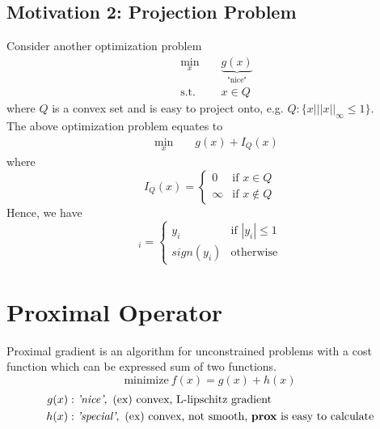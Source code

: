 \documentclass[12pt]{report}
\begin{document}
\subsection{Motivation 2: Projection Problem}
Consider another optimization problem
\begin{equation}
\begin{aligned}
    &  \underset{x}{\text{ min }}
    && \underbrace{g(x)}_{\text{"nice"}} \\
    &  \text{ s.t. } 
    && x \in Q
\end{aligned}
\end{equation}
where $Q$ is a convex set and is easy to project onto, e.g. $Q: \{ x| ||x||_{\infty} \leq 1 \}$. \\
The above optimization problem equates to 
\begin{equation}
\begin{aligned}
    &  \underset{x}{\text{ min }}
    && g(x) + I_Q(x) 
\end{aligned}
\end{equation}
where 
\begin{equation}
    I_Q (x) = 
   \begin{cases}
   0 &\mbox{if } x \in Q  \\
   \infty &\mbox{if } x \not \in Q
   \end{cases}
  \end{equation}
Hence, we have 
\begin{equation}
    [P_Q(y)]_i =
   \begin{cases}
   y_i &\mbox{if } |y_i| \leq 1  \\
   sign(y_i) &\mbox{otherwise} 
   \end{cases}
  \end{equation}
  
\section{Proximal Operator} \label{PGA_OPERATOR}
Proximal gradient is an algorithm for unconstrained problems with a cost function which can be expressed sum of two functions.
\begin{equation}
\textrm{minimize}~f(x)=g(x)+h(x)
\end{equation}
\vspace{-2.5em}
\begin{align*}
g(x)&: \textit{'nice'}, \text{ (ex) convex, L-lipschitz gradient}\\
h(x)&: \textit{'special'}, \text{ (ex) convex, not smooth, \textbf{prox} is easy to calculate}
\end{align*}
\end{document}
